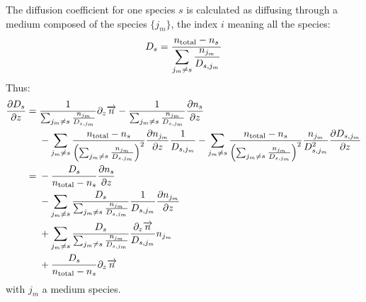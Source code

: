 The diffusion coefficient for one species $s$ is calculated as diffusing through
a medium composed of the species $\{j_m\}$, the index $i$ meaning all the
species:
\begin{equation}
D_s = \frac{n_\text{total} - n_s}{\displaystyle\sum_{j_m \neq s}\frac{n_{j_m}}{D_{s,j_m}}}
\label{Titan:Ds}
\end{equation}
Thus:
\begin{equation}
\begin{split}
\frac{\partial D_s}{\partial z} = &\;   \frac{1}{\sum_{j_m \neq s}\frac{n_{j_m}}{D_{s,j_m}}}\partial_{z}{\overrightarrow{n}} 
                        - \frac{1}{\sum_{j_m \neq s}\frac{n_{j_m}}{D_{s,j_m}}}\frac{\partial n_s}{\partial z} \\
                    &\; - \sum_{j_m\neq s}\frac{n_\text{total} - n_s}{\left(\sum_{j_m \neq s}\frac{n_{j_m}}{D_{s,j_m}}\right)^2}
                                \frac{\partial n_{j_m}}{\partial z}\frac{1}{D_{s,j_m}} 
                        -  \sum_{j_m\neq s}\frac{n_\text{total} - n_s}{\left(\sum_{j_m \neq s}\frac{n_{j_m}}{D_{s,j_m}}\right)^2} 
                                \frac{n_{j_m}}{D_{s,j_m}^2}\frac{\partial D_{s,j_m}}{\partial z}\\
                  = &\; - \frac{D_s}{n_\text{total} - n_s}\frac{\partial n_s}{\partial z} \\
                    &\; - \sum_{j_m\neq s}\frac{D_s}{\sum_{j_m \neq s}\frac{n_{j_m}}{D_{s,j_m}}}
                                \frac{1}{D_{s,j_m}} \frac{\partial n_{j_m}}{\partial z} \\
                    &\; +  \sum_{j_m\neq s}\frac{D_s}{\sum_{j_m \neq s}\frac{n_{j_m}}{D_{s,j_m}}} 
                                \frac{\partial_{z}{\overrightarrow{n}}}{D_{s,j_m}}n_{j_m} \\
                    &\; + \frac{D_s}{n_\text{total} - n_s}\partial_{z}{\overrightarrow{n}} \\
\end{split}
\label{Titan:dDs_dz}
\end{equation}
with $j_m$ a medium species.

